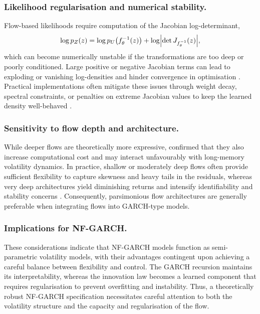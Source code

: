 \documentclass[oneside,12pt]{CUEDthesisPSnPDF}
\newcommand{\parencite}{\citep}
\begin{document}
\subsubsection{Likelihood regularisation and numerical stability.}
Flow-based likelihoods require computation of the Jacobian log-determinant,
\[
\log p_Z(z) = \log p_U\big(f^{-1}_\theta(z)\big)
             + \log \Bigl|\det J_{f^{-1}_\theta}(z)\Bigr|,
\]
which can become numerically unstable if the transformations are too deep or poorly conditioned. Large positive or negative Jacobian terms can lead to exploding or vanishing log-densities and hinder convergence in optimisation \parencite{papamakarios2021normalizing}. Practical implementations often mitigate these issues through weight decay, spectral constraints, or penalties on extreme Jacobian values to keep the learned density well-behaved \parencite{papamakarios2021normalizing}.\\

\subsubsection{Sensitivity to flow depth and architecture.}
While deeper flows are theoretically more expressive, \parencite{papamakarios2021normalizing} confirmed that they also increase computational cost and may interact unfavourably with long-memory volatility dynamics. In practice, shallow or moderately deep flows often provide sufficient flexibility to capture skewness and heavy tails in the residuals, whereas very deep architectures yield diminishing returns and intensify identifiability and stability concerns\parencite{liu2020flows} . Consequently, parsimonious flow architectures are generally preferable when integrating flows into GARCH-type models.\\

\subsubsection{Implications for NF-GARCH.}
These considerations indicate that NF-GARCH models function as semi-parametric volatility models, with their advantages contingent upon achieving a careful balance between flexibility and control. The GARCH recursion maintains its interpretability, whereas the innovation law becomes a learned component that requires regularisation to prevent overfitting and instability. Thus, a theoretically robust NF-GARCH specification necessitates careful attention to both the volatility structure and the capacity and regularisation of the flow.\\
\end{document}

